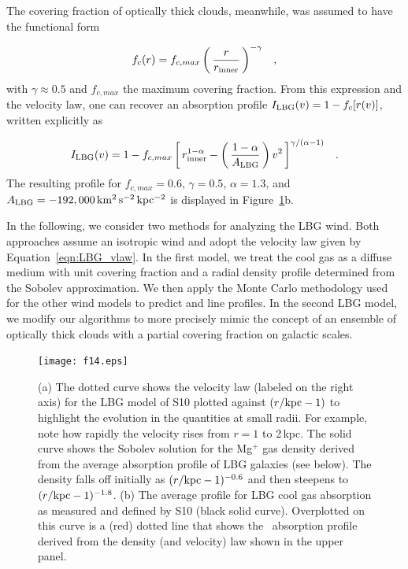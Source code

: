 \documentclass[]{emulateapj}
\begin{document}
The covering fraction of optically thick clouds, meanwhile, was assumed to have
the functional form

\begin{equation}
f_c(r) = f_{c,max} \left ( \, \frac{r}{r_{\rm inner}} \, \right )^{-\gamma} \;\;\; ,
\label{eqn:covering}
\end{equation}
with $\gamma \approx 0.5$ and $f_{c,max}$ the maximum covering
fraction.  From this expression and the velocity law, one can recover
an absorption profile $I_{\rm LBG}(v) = 1 - f_c[r(v)]$, written
explicitly as

\begin{equation}
I_{\rm LBG}(v) = 1 - f_{c,max} \left [ \, r_{\rm inner}^{1-\alpha} - \left ( \,
\frac{1-\alpha}{A_{\rm LBG}} \, \right ) v^2 \, \right ]^{\gamma/(\alpha-1)}
\;\;\; .
\label{eqn:LBG_I}
\end{equation}
The resulting profile for $f_{c,max} = 0.6$, $\gamma=0.5$,
$\alpha=1.3$, and $A_{\rm LBG} = -192,000 \, \rm km^2 \, s^{-2} \, kpc^{-2}$ 
is displayed in Figure~\ref{fig:LBG_Sobolev}b.  

In the following, we consider two methods for analyzing the LBG wind.
Both approaches assume an isotropic wind and adopt the velocity law given by
Equation~\ref{eqn:LBG_vlaw}.  In the first model, we treat the cool gas as a
diffuse medium with unit covering fraction and a radial density
profile determined from the Sobolev approximation.  We then apply 
the Monte Carlo methodology used for the other wind models to predict
 and  line profiles.  In the second LBG model,
we modify our algorithms to more precisely mimic the concept of an
ensemble of optically thick clouds with a partial covering fraction on
galactic scales.

\begin{figure}
\texttt{[image: f14.eps]}
\caption{
(a) The dotted curve shows the velocity law (labeled on the
right axis) for the LBG model
of S10 plotted against $(r/{\rm kpc} -1)$ to highlight the evolution
in the quantities at small radii.  For example,  note how rapidly the velocity rises from $r =
1$ to 2\,kpc.  The solid curve shows the Sobolev solution for the
Mg$^+$ gas
density derived from 
the average absorption profile of LBG galaxies (see below).
The density falls off initially as $(r/{\rm kpc}-1)^{-0.6}$ and then
steepens to $(r/{\rm kpc}-1)^{-1.8}$.
(b) The average profile for LBG cool gas absorption as
measured and defined by S10
(black solid curve).  Overplotted on this curve is a (red) dotted line that
shows the \mgiia\ absorption profile derived from the density (and velocity)
law shown in the upper panel.  
}
\label{fig:LBG_Sobolev}
\end{figure}
\end{document}
